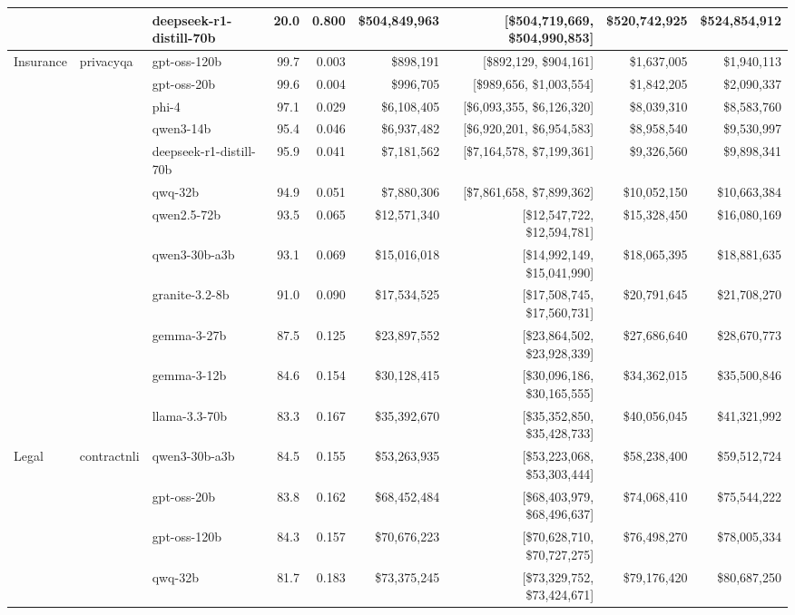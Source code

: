 \begin{table}[t]
\begin{tabular}{lllrrrrrr}
   &  & deepseek-r1-distill-70b & 20.0 & 0.800 & \$504,849,963 & [\$504,719,669, \$504,990,853] & \$520,742,925 & \$524,854,912 \\
\midrule
  Insurance & privacyqa & gpt-oss-120b & 99.7 & 0.003 & \$898,191 & [\$892,129, \$904,161] & \$1,637,005 & \$1,940,113 \\
   &  & gpt-oss-20b & 99.6 & 0.004 & \$996,705 & [\$989,656, \$1,003,554] & \$1,842,205 & \$2,090,337 \\
   &  & phi-4 & 97.1 & 0.029 & \$6,108,405 & [\$6,093,355, \$6,126,320] & \$8,039,310 & \$8,583,760 \\
   &  & qwen3-14b & 95.4 & 0.046 & \$6,937,482 & [\$6,920,201, \$6,954,583] & \$8,958,540 & \$9,530,997 \\
   &  & deepseek-r1-distill-70b & 95.9 & 0.041 & \$7,181,562 & [\$7,164,578, \$7,199,361] & \$9,326,560 & \$9,898,341 \\
   &  & qwq-32b & 94.9 & 0.051 & \$7,880,306 & [\$7,861,658, \$7,899,362] & \$10,052,150 & \$10,663,384 \\
   &  & qwen2.5-72b & 93.5 & 0.065 & \$12,571,340 & [\$12,547,722, \$12,594,781] & \$15,328,450 & \$16,080,169 \\
   &  & qwen3-30b-a3b & 93.1 & 0.069 & \$15,016,018 & [\$14,992,149, \$15,041,990] & \$18,065,395 & \$18,881,635 \\
   &  & granite-3.2-8b & 91.0 & 0.090 & \$17,534,525 & [\$17,508,745, \$17,560,731] & \$20,791,645 & \$21,708,270 \\
   &  & gemma-3-27b & 87.5 & 0.125 & \$23,897,552 & [\$23,864,502, \$23,928,339] & \$27,686,640 & \$28,670,773 \\
   &  & gemma-3-12b & 84.6 & 0.154 & \$30,128,415 & [\$30,096,186, \$30,165,555] & \$34,362,015 & \$35,500,846 \\
   &  & llama-3.3-70b & 83.3 & 0.167 & \$35,392,670 & [\$35,352,850, \$35,428,733] & \$40,056,045 & \$41,321,992 \\
\midrule
  Legal & contractnli & qwen3-30b-a3b & 84.5 & 0.155 & \$53,263,935 & [\$53,223,068, \$53,303,444] & \$58,238,400 & \$59,512,724 \\
   &  & gpt-oss-20b & 83.8 & 0.162 & \$68,452,484 & [\$68,403,979, \$68,496,637] & \$74,068,410 & \$75,544,222 \\
   &  & gpt-oss-120b & 84.3 & 0.157 & \$70,676,223 & [\$70,628,710, \$70,727,275] & \$76,498,270 & \$78,005,334 \\
   &  & qwq-32b & 81.7 & 0.183 & \$73,375,245 & [\$73,329,752, \$73,424,671] & \$79,176,420 & \$80,687,250 \\

\end{tabular}
\end{table}
